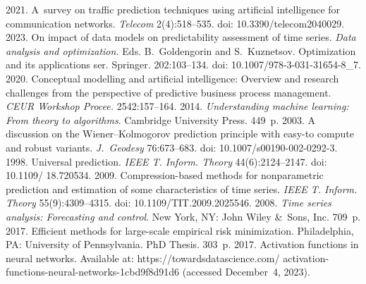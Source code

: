   \begin{multicols}{2}

\renewcommand{\bibname}{\protect\rmfamily References}

{\small\frenchspacing
 {%
 \begin{thebibliography}{99} 
 2021. A~survey on traffic prediction 
techniques using artificial intelligence for communication networks. 
\textit{Telecom} 2(4):518--535. doi: 10.3390/telecom2040029.
 2023. On impact of data models on predictability assessment of 
time series. \textit{Data analysis and optimization.} Eds. B.~Goldengorin and 
S.~Kuznetsov.  Optimization and its applications ser. Springer. 202:103--134. doi: 
10.1007/978-3-031-31654-8\_7.
 2020. Conceptual modelling and artificial intelligence: Overview 
and research challenges from the perspective of predictive business process 
management. \textit{CEUR 
Workshop Procee.} 2542:157--164. 
 2014. \textit{Understanding machine learning: From 
theory to algorithms}. Cambridge University Press. 449~p.
 2003. A discussion on the 
 Wiener--Kolmogorov prediction principle with easy-to compute and robust 
variants. \textit{J.~Geodesy} 76:673--683. doi: 10.1007/s00190-002-0292-3.
 1998. Universal prediction. \textit{IEEE T. 
Inform. Theory} 44(6):2124--2147. doi: 10.1109/ 18.720534.
 2009. Compression-based methods for nonparametric prediction 
and estimation of some characteristics of time series. \textit{IEEE T. Inform. 
Theory} 55(9):4309--4315. doi: 10.1109/TIT.2009.2025546.
 2008. \textit{Time series 
analysis: Forecasting and control}. New York, NY: John Wiley \&~Sons, 
Inc. 709~p.
 2017. Efficient methods for large-scale empirical risk 
minimization.  Philadelphia, PA: University of Pennsylvania. PhD Thesis. 303~p.
 2017. Activation functions in neural networks. Available at: {\sf 
https://towardsdatascience.com/ activation-functions-neural-networks-1cbd9f8d91d6} 
(accessed December~4, 2023).


\end{thebibliography}}}
\end{multicols}
